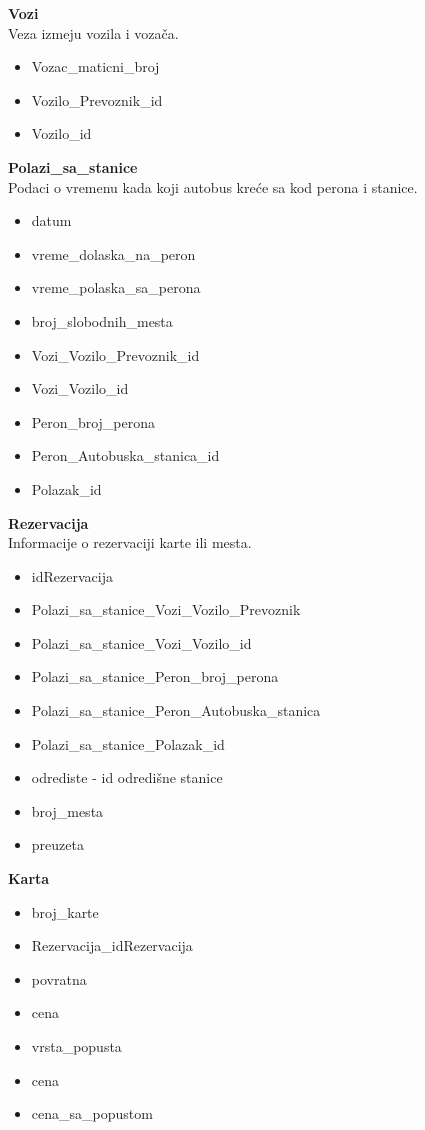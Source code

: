 \textbf{Vozi} \\
Veza izmeju vozila i voza\v ca.
\begin{itemize}
	\item Vozac\_maticni\_broj
	\item Vozilo\_Prevoznik\_id
	\item Vozilo\_id
\end{itemize}
\textbf{Polazi\_sa\_stanice} \\
Podaci o vremenu kada koji autobus kre\'ce sa kod perona i stanice.
\begin{itemize}
	\item datum
	\item vreme\_dolaska\_na\_peron
	\item vreme\_polaska\_sa\_perona
	\item broj\_slobodnih\_mesta
	\item Vozi\_Vozilo\_Prevoznik\_id
	\item Vozi\_Vozilo\_id
	\item Peron\_broj\_perona
	\item Peron\_Autobuska\_stanica\_id
	\item Polazak\_id
\end{itemize}
\textbf{Rezervacija}\\
Informacije o rezervaciji karte ili mesta.
\begin{itemize}
	\item idRezervacija
	\item Polazi\_sa\_stanice\_Vozi\_Vozilo\_Prevoznik
	\item Polazi\_sa\_stanice\_Vozi\_Vozilo\_id
	\item Polazi\_sa\_stanice\_Peron\_broj\_perona
	\item Polazi\_sa\_stanice\_Peron\_Autobuska\_stanica
	\item Polazi\_sa\_stanice\_Polazak\_id
	\item odrediste - id odredi\v sne stanice
	\item broj\_mesta
	\item preuzeta
\end{itemize}
\textbf{Karta}
\begin{itemize}
	\item broj\_karte
	\item Rezervacija\_idRezervacija
	\item povratna
	\item cena
	\item vrsta\_popusta
	\item cena
	\item cena\_sa\_popustom
\end{itemize}
